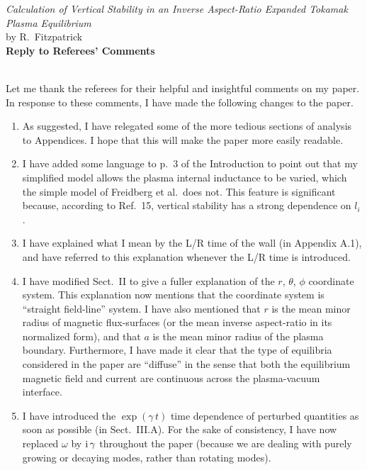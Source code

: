 \documentclass{article}[12pt]
\begin{document}
\begin{center}
{\em Calculation of Vertical Stability in an Inverse Aspect-Ratio
Expanded Tokamak Plasma Equilibrium }\\[1ex]
by R.~Fitzpatrick\\[1ex]
{\bf Reply to Referees' Comments}\\[1ex]
~
\end{center}
Let me thank the  referees for their helpful and insightful comments on my paper. In response to these comments, I
have made the following changes to the paper. 

\begin{enumerate}
\item As suggested, I have relegated some of the more tedious sections of analysis to Appendices. I hope that this
will make the paper more easily readable.

\item I have added some language to p.~3 of the Introduction to point out that my simplified model allows the plasma internal
inductance to be varied, which the simple model of Freidberg et al.\ does not. This feature is significant because, according to Ref.~15, vertical stability
has a strong dependence on $l_i$.

\item I have explained what I mean by the L/R time of the wall (in Appendix A.1), and have referred to this explanation whenever
the L/R time is introduced. 

\item I have modified Sect.~II to give a fuller  explanation of the $r$, $\theta$, $\phi$ coordinate system. This explanation now mentions that
the coordinate system is ``straight field-line'' system. I have also mentioned that $r$ is the mean minor radius of magnetic
flux-surfaces (or the mean inverse aspect-ratio in its normalized form), and that $a$ is the mean minor radius of the plasma boundary. 
Furthermore, I have made it clear that the type of equilibria considered in the paper are ``diffuse'' in the sense that both the equilibrium magnetic
field and current are continuous across the plasma-vacuum interface. 

\item I have introduced the $\exp(\gamma\,t)$ time dependence of perturbed quantities as soon as possible (in Sect.~III.A). 
For the sake of consistency, I have now replaced $\omega$ by ${\rm i}\,\gamma$ throughout the paper (because we are dealing with
purely growing or decaying modes, rather than rotating modes). 


\end{enumerate}
\end{document}
